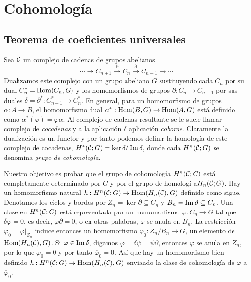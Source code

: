 \documentclass[TA.tex]{subfiles}
\begin{document}

\chapter{Cohomología}
\section{Teorema de coeficientes universales}
Sea $\mathcal{C}$ un complejo de cadenas de grupos abelianos 
\[
\cdots\to C_{n+1}\xrightarrow{\partial} C_n\xrightarrow{\partial} C_{n-1}\to\cdots
\]
Dualizamos este complejo con un grupo abeliano $G$ sustituyendo cada $C_n$ por su dual $C_n^*=\operatorname{Hom}(C_n,G)$ y los homomorfismos de grupos $\partial:C_n\to C_{n-1}$ por sus duales $\delta=\partial^*:C_{n-1}^*\to C_n^*$. En general, para un homomorfismo de grupos $\alpha:A\to B$, el homomorfismo dual $\alpha^*:\operatorname{Hom}(B,G)\to\operatorname{Hom}(A,G)$ está definido como $\alpha^*(\varphi)=\varphi\alpha$. Al complejo de cadenas resultante se le suele llamar complejo de \emph{cocadenas} y a la aplicación $\delta$ aplicación \emph{coborde}. Claramente la dualización es un functor y por tanto podemos definir la homología de este complejo de cocadenas, $H^*(\mathcal{C};G)=\ker\delta/\operatorname{Im}\delta$, donde cada $H^n(\mathcal{C};G)$ se denomina \emph{grupo de cohomología}.

Nuestro objetivo es probar que el grupo de cohomología $H^n(\mathcal{C};G)$ está completamente determinado por $G$ y por el grupo de homologí a$H_n(\mathcal{C};G)$. Hay un homomorfismo natural $h:H^n(\mathcal{C};G)\to\operatorname{Hom}(H_n(\mathcal{C}),G)$ definido como sigue. Denotamos los ciclos y bordes por $Z_n=\ker\partial\subseteq C_n$ y $B_n=\operatorname{Im}\partial\subseteq C_n$. Una clase en $H^n(\mathcal{C};G)$ está representada por un homomorfismo $\varphi:C_n\to G$ tal que $\delta\varphi=0$, es decir, $\varphi\partial=0$, o en otras palabras, $\varphi$ se anula en $B_n$. La restricción $\varphi_0=\varphi|_{Z_n}$ induce entonces un homomorfismo $\overline{\varphi}_0:Z_n/B_n\to G$, un elemento de $\operatorname{Hom}(H_n(\mathcal{C}),G)$. Si $\varphi\in\operatorname{Im}\delta$, digamos $\varphi=\delta\psi=\psi\partial$, entonces $\varphi$ se anula en $Z_n$, por lo que $\varphi_0=0$ y por tanto $\overline{\varphi}_0=0$. Así que hay un homomorfismo bien definido $h:H^n(\mathcal{C};G)\to\operatorname{Hom}(H_n(\mathcal{C}),G)$ enviando la clase de cohomología de $\varphi$ a $\overline{\varphi}_0$.
\end{document}
